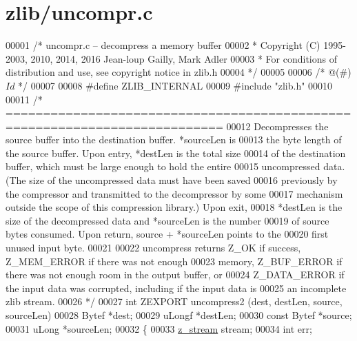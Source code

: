 \hypertarget{zlib_2uncompr_8c_source}{}\section{zlib/uncompr.c}
\label{zlib_2uncompr_8c_source}

\begin{DoxyCode}
00001 \textcolor{comment}{/* uncompr.c -- decompress a memory buffer}
00002 \textcolor{comment}{ * Copyright (C) 1995-2003, 2010, 2014, 2016 Jean-loup Gailly, Mark Adler}
00003 \textcolor{comment}{ * For conditions of distribution and use, see copyright notice in zlib.h}
00004 \textcolor{comment}{ */}
00005 
00006 \textcolor{comment}{/* @(#) $Id$ */}
00007 
00008 \textcolor{preprocessor}{#define ZLIB\_INTERNAL}
00009 \textcolor{preprocessor}{#include "zlib.h"}
00010 
00011 \textcolor{comment}{/* ===========================================================================}
00012 \textcolor{comment}{     Decompresses the source buffer into the destination buffer.  *sourceLen is}
00013 \textcolor{comment}{   the byte length of the source buffer. Upon entry, *destLen is the total size}
00014 \textcolor{comment}{   of the destination buffer, which must be large enough to hold the entire}
00015 \textcolor{comment}{   uncompressed data. (The size of the uncompressed data must have been saved}
00016 \textcolor{comment}{   previously by the compressor and transmitted to the decompressor by some}
00017 \textcolor{comment}{   mechanism outside the scope of this compression library.) Upon exit,}
00018 \textcolor{comment}{   *destLen is the size of the decompressed data and *sourceLen is the number}
00019 \textcolor{comment}{   of source bytes consumed. Upon return, source + *sourceLen points to the}
00020 \textcolor{comment}{   first unused input byte.}
00021 \textcolor{comment}{}
00022 \textcolor{comment}{     uncompress returns Z\_OK if success, Z\_MEM\_ERROR if there was not enough}
00023 \textcolor{comment}{   memory, Z\_BUF\_ERROR if there was not enough room in the output buffer, or}
00024 \textcolor{comment}{   Z\_DATA\_ERROR if the input data was corrupted, including if the input data is}
00025 \textcolor{comment}{   an incomplete zlib stream.}
00026 \textcolor{comment}{*/}
00027 \textcolor{keywordtype}{int} ZEXPORT uncompress2 (dest, destLen, source, sourceLen)
00028     Bytef *dest;
00029     uLongf *destLen;
00030     \textcolor{keyword}{const} Bytef *source;
00031     uLong *sourceLen;
00032 \{
00033     \hyperlink{structz__stream__s}{z\_stream} stream;
00034     \textcolor{keywordtype}{int} err;

\end{DoxyCode}
